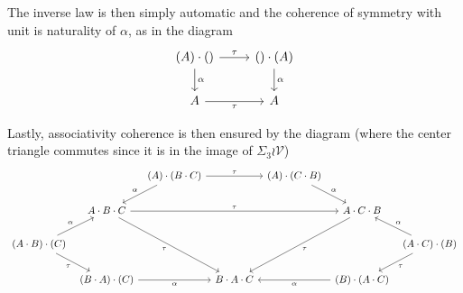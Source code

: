 \documentclass[a4paper,10pt]{article}%
\begin{document}
The inverse law is then simply automatic and the coherence of symmetry with unit is naturality of $\alpha$, as in the diagram
\[
\begin{tikzcd}
	(A) \cdot () \ar{r}{\tau} \ar{d}{\alpha} &
	() \cdot (A) \ar{d}{\alpha}
\\
	A \ar{r}[swap]{\tau} &
	A
\end{tikzcd}
\]

Lastly, associativity coherence is then ensured by the diagram (where the center triangle commutes since it is in the image of $\Sigma_3 \wr \mathcal{V}$)
\[
\begin{tikzcd}[column sep = 5pt]
	&
	&
	(A)\cdot (B \cdot C) \ar{rr}{\tau} \ar{dl}[swap]{\alpha}&
	&
	(A) \cdot (C \cdot B)\ar{dr}{\alpha}
\\
	&
	A \cdot B  \cdot C \ar{rrrr}{\tau} \ar{ddrr}[swap]{\tau}&
	&
	& 
	&
	A \cdot C \cdot B \ar{ddll}{\tau}
\\
	(A \cdot B) \cdot (C) \ar{ru}{\alpha} \ar{rd}[swap]{\tau}&
	&
	&
	&
	&
	&
	(A \cdot C)  \cdot (B) \ar{lu}[swap]{\alpha} \ar{dl}{\tau}
\\
	&
	(B\cdot A) \cdot (C) \ar{rr}[swap]{\alpha} &&
	B \cdot A \cdot C &&
	(B) \cdot (A \cdot C)	\ar{ll}{\alpha}
\end{tikzcd}
\]




{}




\end{document}
